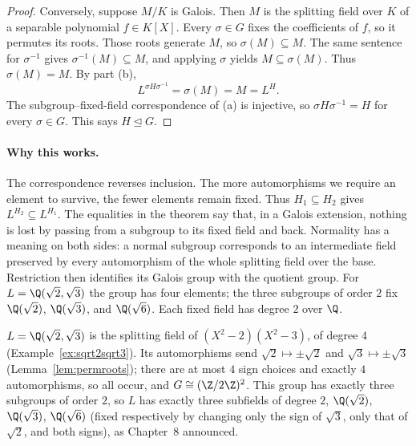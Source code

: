 \begin{proof}
Conversely, suppose $M/K$ is Galois. Then $M$ is the splitting field over $K$ of a separable polynomial $f\in K[X]$. Every $\sigma\in G$ fixes the coefficients of $f$, so it permutes its roots. Those roots generate $M$, so $\sigma(M)\subseteq M$. The same sentence for $\sigma^{-1}$ gives $\sigma^{-1}(M)\subseteq M$, and applying $\sigma$ yields $M\subseteq\sigma(M)$. Thus $\sigma(M)=M$. By part (b),
\[
L^{\sigma H\sigma^{-1}}=\sigma(M)=M=L^H.
\]
The subgroup--fixed-field correspondence of (a) is injective, so $\sigma H\sigma^{-1}=H$ for every $\sigma\in G$. This says $H\trianglelefteq G$.
\end{proof}

\paragraph{Why this works.}
The correspondence reverses inclusion. The more automorphisms we require an element to survive, the fewer elements remain fixed. Thus $H_1\subseteq H_2$ gives $L^{H_2}\subseteq L^{H_1}$. The equalities in the theorem say that, in a Galois extension, nothing is lost by passing from a subgroup to its fixed field and back. Normality has a meaning on both sides: a normal subgroup corresponds to an intermediate field preserved by every automorphism of the whole splitting field over the base. Restriction then identifies its Galois group with the quotient group. For $L=\Q(\sqrt2,\sqrt3)$ the group has four elements; the three subgroups of order $2$ fix $\Q(\sqrt2)$, $\Q(\sqrt3)$, and $\Q(\sqrt6)$. Each fixed field has degree $2$ over $\Q$.

\begin{example}\label{ex:galv4}
$L=\Q(\sqrt2,\sqrt3)$ is the splitting field of $(X^2-2)(X^2-3)$, of degree $4$ (Example~\ref{ex:sqrt2sqrt3}). Its automorphisms send $\sqrt2\mapsto\pm\sqrt2$ and $\sqrt3\mapsto\pm\sqrt3$ (Lemma~\ref{lem:permroots}); there are at most $4$ sign choices and exactly $4$ automorphisms, so all occur, and $G\cong(\Z/2\Z)^2$. This group has exactly three subgroups of order $2$, so $L$ has exactly three subfields of degree $2$, $\Q(\sqrt2)$, $\Q(\sqrt3)$, $\Q(\sqrt6)$ (fixed respectively by changing only the sign of $\sqrt3$, only that of $\sqrt2$, and both signs), as Chapter~8 announced.
\end{example}

